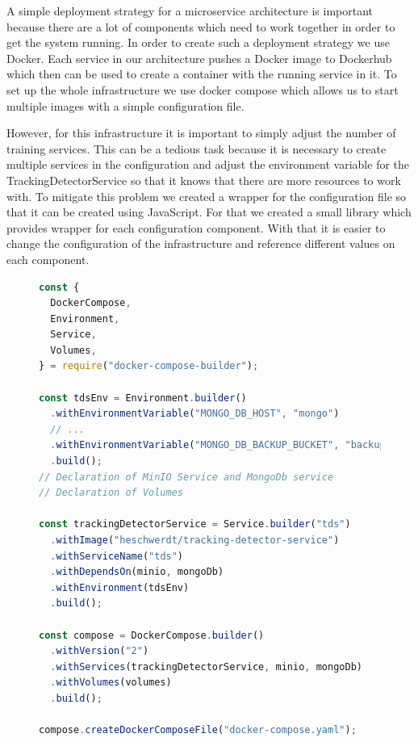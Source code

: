 A simple deployment strategy for a microservice architecture is important because there are a lot of components which need to work
together in order to get the system running. In order to create such a deployment strategy we use Docker. Each service in our architecture
pushes a Docker image to Dockerhub which then can be used to create a container with the running service in it. To set up the whole
infrastructure we use docker compose which allows us to start multiple images with a simple configuration file. 

However, for this infrastructure it is important to simply adjust the number of training services. This can be a tedious task because 
it is necessary to create multiple services in the configuration and adjust the environment variable for the TrackingDetectorService so that
it knows that there are more resources to work with. To mitigate this problem we created a wrapper for the configuration file so that it can
be created using JavaScript. For that we created a small library which provides wrapper for each configuration component. With that it is easier
to change the configuration of the infrastructure and reference different values on each component.

\begin{figure}[ht!]
\begin{lstlisting}[language=JavaScript]
const {
  DockerCompose,
  Environment,
  Service,
  Volumes,
} = require("docker-compose-builder");

const tdsEnv = Environment.builder()
  .withEnvironmentVariable("MONGO_DB_HOST", "mongo")
  // ...
  .withEnvironmentVariable("MONGO_DB_BACKUP_BUCKET", "backup")
  .build();
// Declaration of MinIO Service and MongoDb service
// Declaration of Volumes

const trackingDetectorService = Service.builder("tds")
  .withImage("heschwerdt/tracking-detector-service")
  .withServiceName("tds")
  .withDependsOn(minio, mongoDb)
  .withEnvironment(tdsEnv)
  .build();

const compose = DockerCompose.builder()
  .withVersion("2")
  .withServices(trackingDetectorService, minio, mongoDb)
  .withVolumes(volumes)
  .build();

compose.createDockerComposeFile("docker-compose.yaml");
\end{lstlisting}
\caption{}
\label{fig:DockerCompose}
\end{figure}

